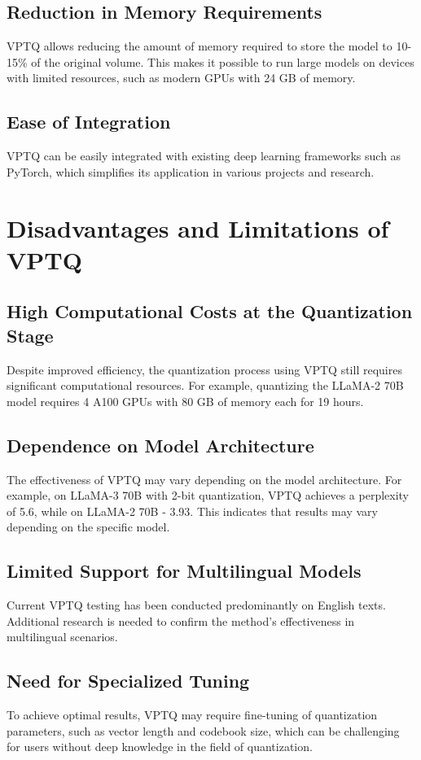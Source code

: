 \documentclass{article}
\begin{document}
\subsection{Reduction in Memory Requirements}
VPTQ allows reducing the amount of memory required to store the model to 10-15\% of the original volume. This makes it possible to run large models on devices with limited resources, such as modern GPUs with 24 GB of memory.

\subsection{Ease of Integration}
VPTQ can be easily integrated with existing deep learning frameworks such as PyTorch, which simplifies its application in various projects and research.

\section{Disadvantages and Limitations of VPTQ}

\subsection{High Computational Costs at the Quantization Stage}
Despite improved efficiency, the quantization process using VPTQ still requires significant computational resources. For example, quantizing the LLaMA-2 70B model requires 4 A100 GPUs with 80 GB of memory each for 19 hours.

\subsection{Dependence on Model Architecture}
The effectiveness of VPTQ may vary depending on the model architecture. For example, on LLaMA-3 70B with 2-bit quantization, VPTQ achieves a perplexity of 5.6, while on LLaMA-2 70B - 3.93. This indicates that results may vary depending on the specific model.

\subsection{Limited Support for Multilingual Models}
Current VPTQ testing has been conducted predominantly on English texts. Additional research is needed to confirm the method's effectiveness in multilingual scenarios.

\subsection{Need for Specialized Tuning}
To achieve optimal results, VPTQ may require fine-tuning of quantization parameters, such as vector length and codebook size, which can be challenging for users without deep knowledge in the field of quantization.
\end{document}
